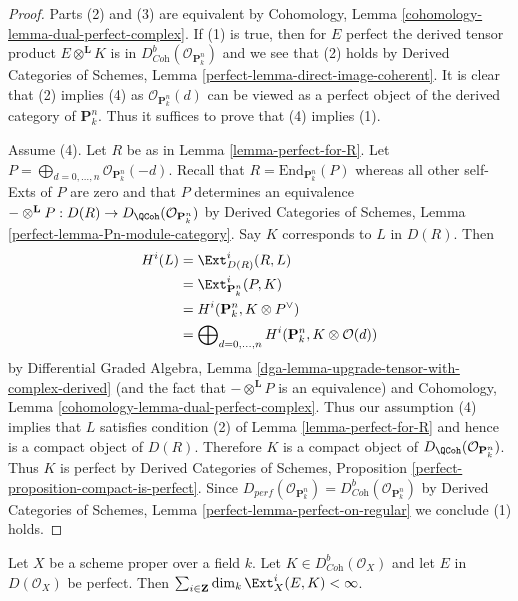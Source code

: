 \begin{proof}
Parts (2) and (3) are equivalent by
Cohomology, Lemma \ref{cohomology-lemma-dual-perfect-complex}.
If (1) is true, then for $E$ perfect the derived tensor product
$E \otimes^\mathbf{L} K$ is in
$D^b_{\textit{Coh}}(\mathcal{O}_{\mathbf{P}^n_k})$
and we see that (2) holds by 
Derived Categories of Schemes, Lemma \ref{perfect-lemma-direct-image-coherent}.
It is clear that (2) implies (4) as $\mathcal{O}_{\mathbf{P}^n_k}(d)$
can be viewed
as a perfect object of the derived category of $\mathbf{P}^n_k$.
Thus it suffices to prove that (4) implies (1).

\medskip\noindent
Assume (4). Let $R$ be as in Lemma \ref{lemma-perfect-for-R}.
Let $P = \bigoplus_{d = 0, \ldots, n} \mathcal{O}_{\mathbf{P}^n_k}(-d)$.
Recall that $R = \text{End}_{\mathbf{P}^n_k}(P)$ whereas all other
self-Exts of $P$ are zero and that $P$ determines an equivalence
$- \otimes^\mathbf{L} P : D(R) \to D_\QCoh(\mathcal{O}_{\mathbf{P}^n_k})$
by Derived Categories of Schemes, Lemma \ref{perfect-lemma-Pn-module-category}.
Say $K$ corresponds to $L$ in $D(R)$. Then
\begin{align*}
H^i(L)
& =
\Ext^i_{D(R)}(R, L) \\
& =
\Ext^i_{\mathbf{P}^n_k}(P, K) \\
& =
H^i(\mathbf{P}^n_k, K \otimes P^\vee) \\
& =
\bigoplus\nolimits_{d = 0, \ldots, n}
H^i(\mathbf{P}^n_k, K \otimes \mathcal{O}(d))
\end{align*}
by Differential Graded Algebra, Lemma
\ref{dga-lemma-upgrade-tensor-with-complex-derived}
(and the fact that $- \otimes^\mathbf{L} P$ is an equivalence)
and Cohomology, Lemma \ref{cohomology-lemma-dual-perfect-complex}.
Thus our assumption (4) implies that $L$ satisfies condition (2) of
Lemma \ref{lemma-perfect-for-R} and hence is a compact object of $D(R)$.
Therefore $K$ is a compact object of
$D_\QCoh(\mathcal{O}_{\mathbf{P}^n_k})$.
Thus $K$ is perfect by
Derived Categories of Schemes, Proposition
\ref{perfect-proposition-compact-is-perfect}.
Since $D_{perf}(\mathcal{O}_{\mathbf{P}^n_k}) =
D^b_{\textit{Coh}}(\mathcal{O}_{\mathbf{P}^n_k})$
by
Derived Categories of Schemes, Lemma \ref{perfect-lemma-perfect-on-regular}
we conclude (1) holds.
\end{proof}

\begin{lemma}
\label{lemma-finiteness}
Let $X$ be a scheme proper over a field $k$. Let
$K \in D^b_{\textit{Coh}}(\mathcal{O}_X)$ and let $E$ in $D(\mathcal{O}_X)$
be perfect. Then
$\sum_{i \in \mathbf{Z}} \dim_k \Ext^i_X(E, K) < \infty$.
\end{lemma}

